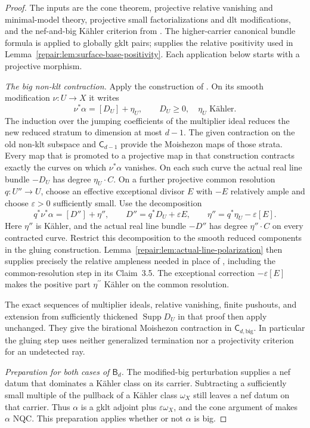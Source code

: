 \begin{proof}
The inputs are the cone theorem, projective relative vanishing and
minimal-model theory, projective small factorializations and dlt
modifications, and the nef-and-big K\"ahler criterion from
\cite{HX2026,HLX2026}. The higher-carrier canonical bundle formula
\cite[Theorem~2.3]{HP2024} is applied to globally gklt pairs;
\cite[Theorem~2.2]{HP2024} supplies the relative positivity used
in Lemma~\ref{repair:lem:surface-base-positivity}. Each application
below starts with a projective morphism.

\smallskip\noindent
\emph{The big non-klt contraction.}
Apply the construction of \cite[Section~3]{HX2026}. On its smooth
modification $\nu:U\to X$ it writes
\[
 \nu^*\alpha=[D_U]+\eta_U,
 \qquad D_U\geq0,\quad \eta_U\text{ K\"ahler}.
\]
The induction over the jumping coefficients of the multiplier
ideal reduces the new reduced stratum to dimension at most $d-1$.
The given contraction on the old non-klt subspace and
$\mathsf C_{d-1}$ provide the Moishezon maps of those strata.
Every map that is promoted to a projective map in that construction
contracts exactly the curves on which $\nu^*\alpha$ vanishes.
On each such curve the actual real line bundle $-D_U$ has degree
$\eta_U\cdot C$. On a further projective common resolution
$q:U''\to U$, choose an effective exceptional divisor $E$ with
$-E$ relatively ample and choose $\varepsilon>0$ sufficiently small.
Use the decomposition
\[
 q^*\nu^*\alpha=[D'']+\eta'',\qquad
 D''=q^*D_U+\varepsilon E,\qquad
 \eta''=q^*\eta_U-\varepsilon[E].
\]
Here $\eta''$ is K\"ahler, and the actual real line bundle $-D''$
has degree $\eta''\cdot C$ on every contracted curve. Restrict this
decomposition to the smooth reduced components in the gluing
construction. Lemma~\ref{repair:lem:actual-line-polarization} then supplies
precisely the relative ampleness needed in place of
\cite[Lemma~2.42]{HX2026}, including the common-resolution step in its
Claim~3.5. The exceptional correction $-\varepsilon[E]$ makes the
positive part $\eta^{\prime\prime}$ K\"ahler on the common resolution.

The exact sequences of multiplier ideals, relative vanishing,
finite pushouts, and extension from sufficiently thickened
$\operatorname{Supp}D_U$ in that proof then apply unchanged.
They give the birational Moishezon contraction in
$\mathsf C_{d,\mathrm{big}}$. In particular the gluing step uses
neither generalized termination nor a projectivity criterion for
an undetected ray.

\smallskip\noindent
\emph{Preparation for both cases of $\mathsf B_d$.}
The modified-big perturbation
\cite[Lemma~2.23]{HX2026} supplies a nef datum that dominates a
K\"ahler class on its carrier. Subtracting a sufficiently small
multiple of the pullback of a K\"ahler class $\omega_X$ still leaves
a nef datum on that carrier. Thus
$\alpha$ is a gklt adjoint plus $\varepsilon\omega_X$, and the cone
argument of \cite[Lemma~2.45]{HX2026} makes $\alpha$ NQC.
This preparation applies whether or not $\alpha$ is big.


\end{proof}
